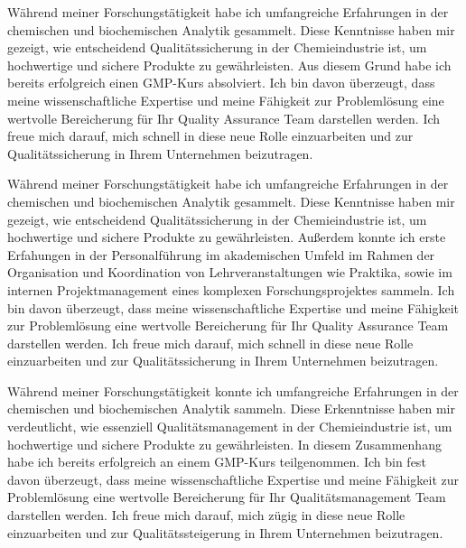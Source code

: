     {Während meiner Forschungstätigkeit habe ich umfangreiche Erfahrungen in der chemischen und biochemischen Analytik gesammelt. Diese Kenntnisse haben mir gezeigt, wie entscheidend Qualitätssicherung in der Chemieindustrie ist, um hochwertige und sichere Produkte zu gewährleisten. Aus diesem Grund habe ich bereits erfolgreich einen GMP-Kurs absolviert. Ich bin davon überzeugt, dass meine wissenschaftliche Expertise und meine Fähigkeit zur Problemlösung eine wertvolle Bereicherung für Ihr Quality Assurance Team darstellen werden. Ich freue mich darauf, mich schnell in diese neue Rolle einzuarbeiten und zur Qualitätssicherung in Ihrem Unternehmen beizutragen.\par }{}
    {Während meiner Forschungstätigkeit habe ich umfangreiche Erfahrungen in der chemischen und biochemischen Analytik gesammelt. Diese Kenntnisse haben mir gezeigt, wie entscheidend Qualitätssicherung in der Chemieindustrie ist, um hochwertige und sichere Produkte zu gewährleisten. Außerdem konnte ich erste Erfahungen in der Personalführung im akademischen Umfeld im Rahmen der Organisation und Koordination von Lehrveranstaltungen wie Praktika, sowie im internen Projektmanagement eines komplexen Forschungsprojektes sammeln. Ich bin davon überzeugt, dass meine wissenschaftliche Expertise und meine Fähigkeit zur Problemlösung eine wertvolle Bereicherung für Ihr Quality Assurance Team darstellen werden. Ich freue mich darauf, mich schnell in diese neue Rolle einzuarbeiten und zur Qualitätssicherung in Ihrem Unternehmen beizutragen.\par }{}
    {Während meiner Forschungstätigkeit konnte ich umfangreiche Erfahrungen in der chemischen und biochemischen Analytik sammeln. Diese Erkenntnisse haben mir verdeutlicht, wie essenziell Qualitätsmanagement in der Chemieindustrie ist, um hochwertige und sichere Produkte zu gewährleisten. In diesem Zusammenhang habe ich bereits erfolgreich an einem GMP-Kurs teilgenommen. Ich bin fest davon überzeugt, dass meine wissenschaftliche Expertise und meine Fähigkeit zur Problemlösung eine wertvolle Bereicherung für Ihr Qualitätsmanagement Team darstellen werden. Ich freue mich darauf, mich zügig in diese neue Rolle einzuarbeiten und zur Qualitätssteigerung in Ihrem Unternehmen beizutragen.\par }{}
